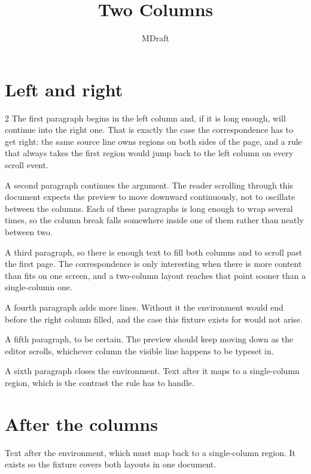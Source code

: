 \documentclass[11pt]{article}
\title{Two Columns}
\author{MDraft}
\begin{document}
\maketitle

\section{Left and right}\label{sec:columns}

\begin{multicols}{2}
The first paragraph begins in the left column and, if it is long enough, will
continue into the right one. That is exactly the case the correspondence has to
get right: the same source line owns regions on both sides of the page, and a
rule that always takes the first region would jump back to the left column on
every scroll event.

A second paragraph continues the argument. The reader scrolling through this
document expects the preview to move downward continuously, not to oscillate
between the columns. Each of these paragraphs is long enough to wrap several
times, so the column break falls somewhere inside one of them rather than neatly
between two.

A third paragraph, so there is enough text to fill both columns and to scroll
past the first page. The correspondence is only interesting when there is more
content than fits on one screen, and a two-column layout reaches that point
sooner than a single-column one.

A fourth paragraph adds more lines. Without it the environment would end before
the right column filled, and the case this fixture exists for would not arise.

A fifth paragraph, to be certain. The preview should keep moving down as the
editor scrolls, whichever column the visible line happens to be typeset in.

A sixth paragraph closes the environment. Text after it maps to a single-column
region, which is the contrast the rule has to handle.
\end{multicols}

\section{After the columns}

Text after the environment, which must map back to a single-column region. It
exists so the fixture covers both layouts in one document.
\end{document}
